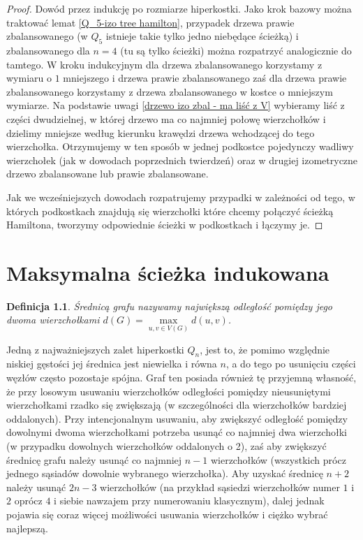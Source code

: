 \documentclass{pracamgr}
\newtheorem{defi}[theorem]{Definicja}
\begin{document}
    \begin{proof}
     Dowód przez indukcję po rozmiarze hiperkostki. Jako krok bazowy można traktować lemat \ref{Q_5-izo tree hamilton}, przypadek drzewa prawie zbalansowanego
     (w $Q_5$ istnieje takie tylko jedno niebędące ścieżką) i zbalansowanego dla $n=4$ (tu są tylko ścieżki) można rozpatrzyć analogicznie do tamtego.
     W kroku indukcyjnym dla drzewa zbalansowanego korzystamy z wymiaru o $1$ mniejszego i drzewa prawie zbalansowanego 
     zaś dla drzewa prawie zbalansowanego korzystamy z drzewa zbalansowanego w kostce o mniejszym wymiarze.
     Na podstawie uwagi \ref{drzewo izo zbal - ma liść z V} wybieramy liść z części dwudzielnej, w której drzewo
     ma co najmniej połowę wierzchołków i dzielimy mniejsze według kierunku krawędzi drzewa wchodzącej do tego wierzchołka.
     Otrzymujemy w ten sposób w jednej podkostce pojedynczy wadliwy wierzchołek (jak w dowodach poprzednich twierdzeń)
     oraz w drugiej izometryczne drzewo zbalansowane lub prawie zbalansowane.
     
     Jak we wcześniejszych dowodach rozpatrujemy przypadki w zależności od tego, w których podkostkach znajdują się wierzchołki
     które chcemy połączyć ścieżką Hamiltona, tworzymy odpowiednie ścieżki w podkostkach i łączymy je.
    \end{proof}

  \chapter{Maksymalna ścieżka indukowana}
   \begin{defi}\label{srednica grafu}
    \emph{Średnicą grafu} nazywamy największą odległość pomiędzy jego dwoma wierzchołkami $d(G)=\max\limits_{u,v\in V(G)}d(u,v)$.
   \end{defi}
   Jedną z najważniejszych zalet hiperkostki $Q_n$, jest to, że pomimo względnie niskiej gęstości jej średnica jest niewielka i równa $n$,
   a do tego po usunięciu części węzłów często pozostaje spójna.
   Graf ten posiada również tę przyjemną własność, że przy losowym usuwaniu wierzchołków odległości pomiędzy nieusuniętymi wierzchołkami rzadko się zwiększają
   (w szczególności dla wierzchołków bardziej oddalonych).
   Przy intencjonalnym usuwaniu, aby zwiększyć odległość pomiędzy dowolnymi dwoma wierzchołkami potrzeba usunąć co najmniej dwa wierzchołki
   (w przypadku dowolnych wierzchołków oddalonych o 2), zaś aby zwiększyć średnicę grafu należy usunąć co najmniej $n-1$ wierzchołków
   (wszystkich prócz jednego sąsiadów dowolnie wybranego wierzchołka).
   Aby uzyskać średnicę $n+2$ należy usunąć $2n-3$ wierzchołków
   (na przykład sąsiedzi wierzchołków numer $1$ i $2$ oprócz $4$ i siebie nawzajem przy numerowaniu klasycznym),
   dalej jednak pojawia się coraz więcej możliwości usuwania wierzchołków i ciężko wybrać najlepszą.
    
\end{document}
